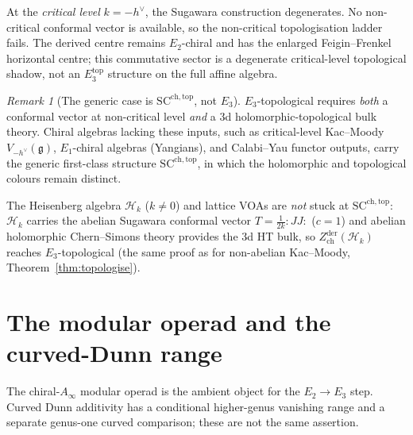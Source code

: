 \documentclass[11pt]{article}
\theoremstyle{remark}
\newtheorem{remark}[theorem]{Remark}
\providecommand{\Ainf}{A_\infty}
\begin{document}
At the \emph{critical level} $k = -h^\vee$, the Sugawara
construction degenerates.  No non-critical conformal vector is
available, so the non-critical topologisation ladder fails.  The
derived centre remains $E_2$-chiral and has the enlarged
Feigin--Frenkel horizontal centre; this commutative sector is a
degenerate critical-level topological shadow, not an
$E_3^{\mathrm{top}}$ structure on the full affine algebra.

\begin{remark}[The generic case is $\mathrm{SC}^{\mathrm{ch,top}}$,
not $E_3$]
$E_3$-topological requires \emph{both} a conformal vector at
non-critical level \emph{and} a 3d holomorphic-topological bulk
theory.  Chiral algebras lacking these inputs, such as critical-level
Kac--Moody $V_{-h^\vee}(\mathfrak{g})$, $E_1$-chiral algebras
(Yangians), and Calabi--Yau functor outputs, carry the generic
first-class structure $\mathrm{SC}^{\mathrm{ch,top}}$, in which
the holomorphic and topological colours remain distinct.

The Heisenberg algebra $\mathcal{H}_k$ ($k \ne 0$) and lattice
VOAs are \emph{not} stuck at $\mathrm{SC}^{\mathrm{ch,top}}$:
$\mathcal{H}_k$ carries the abelian Sugawara conformal vector
$T = \frac{1}{2k}{:}JJ{:}$ ($c = 1$) and abelian holomorphic
Chern--Simons theory provides the 3d HT bulk, so
$Z^{\mathrm{der}}_{\mathrm{ch}}(\mathcal{H}_k)$ reaches
$E_3$-topological (the same proof as for non-abelian
Kac--Moody, Theorem~\ref{thm:topologise}).
\end{remark}


\section{The modular operad and the curved-Dunn range}
\label{sec:frontier}

The chiral-$\Ainf$ modular operad is the ambient object for the
$E_2 \to E_3$ step.  Curved Dunn additivity has a conditional
higher-genus vanishing range and a separate genus-one curved
comparison; these are not the same assertion.
\end{document}
